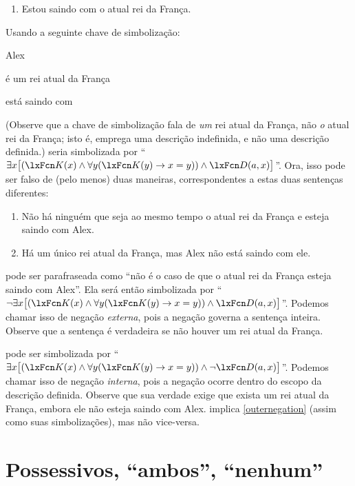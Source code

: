 	\begin{enumerate}
\item\label{kingdate} Estou saindo com o atual rei da França.
	\end{enumerate}
Usando a seguinte chave de simbolização:
	\begin{ekey}
		\item[a] Alex
\item[\atom{K}{x}]  é um rei atual da França
\item[\atom{D}{x,y}]  está saindo com 
	\end{ekey}
(Observe que a chave de simbolização fala de \emph{um} rei atual da França, não \emph{o} atual rei da França; isto é, emprega uma descrição indefinida, e não uma descrição definida.)  seria simbolizada por \textquotedblleft $\exists x \bigl[(\atom{K}{x} \eand \forall y(\atom{K}{y} \eif  x = y)) \eand \atom{D}{a,x}\bigr]$\textquotedblright{}. Ora, isso pode ser falso de (pelo menos) duas maneiras, correspondentes a estas duas sentenças diferentes:
	\begin{enumerate}
\item\label{outernegation} Não há ninguém que seja ao mesmo tempo o atual rei da França e esteja saindo com Alex.
\item\label{innernegation} Há um único rei atual da França, mas Alex não está saindo com ele.
	\end{enumerate}
 pode ser parafraseada como \textquotedblleft não é o caso de que o atual rei da França esteja saindo com Alex\textquotedblright{}. Ela será então simbolizada por \textquotedblleft $\enot \exists x\bigl[(\atom{K}{x} \eand \forall y(\atom{K}{y} \eif  x = y)) \eand \atom{D}{a,x} \bigr]$\textquotedblright{}. Podemos chamar isso de negação \emph{externa}, pois a negação governa a sentença inteira. Observe que a sentença é verdadeira se não houver um rei atual da França.

 pode ser simbolizada por \textquotedblleft $\exists x \bigl[(\atom{K}{x} \eand \forall y(\atom{K}{y} \eif x = y)) \eand \enot \atom{D}{a,x}\bigr]$\textquotedblright{}. Podemos chamar isso de negação \emph{interna}, pois a negação ocorre dentro do escopo da descrição definida. Observe que sua verdade exige que exista um rei atual da França, embora ele não esteja saindo com Alex.
 implica \cref*{outernegation} (assim como suas
simbolizações), mas não vice-versa.

\section{Possessivos, \textquotedblleft ambos\textquotedblright{}, \textquotedblleft nenhum\textquotedblright{}}

